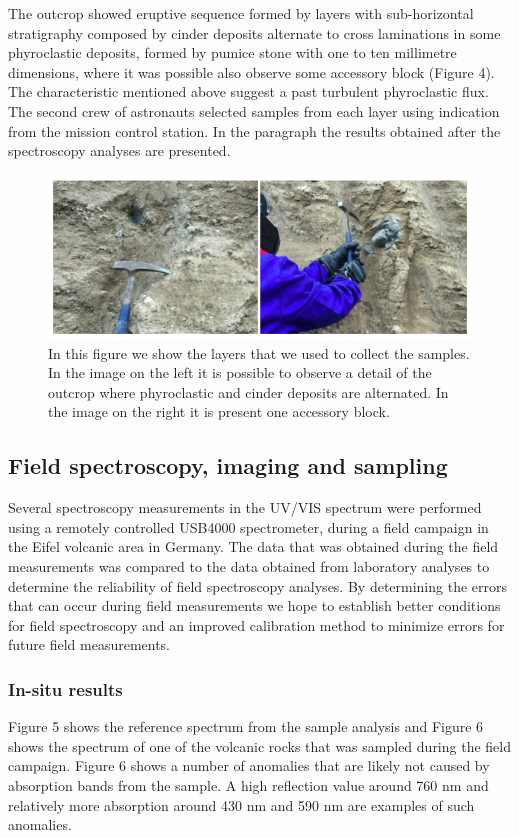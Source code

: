 \documentclass[preprint]{elsarticle}
\begin{document}
The outcrop showed eruptive sequence formed by layers with sub-horizontal stratigraphy composed by cinder deposits alternate to cross laminations in some phyroclastic deposits, formed by pumice stone with one to ten millimetre dimensions, where it was possible also observe some accessory block (Figure 4). The characteristic mentioned above suggest a past turbulent phyroclastic flux. The second crew of astronauts selected samples from each layer using indication from the mission control station. In the paragraph the results obtained after the spectroscopy analyses are presented.

\begin{figure}
\centering
\includegraphics{img/figure04.png}
\caption{In this figure we show the layers that we used to collect the samples. In the image on the left it is possible to observe a detail of the outcrop where phyroclastic and cinder deposits are alternated. In the image on the right it is present one accessory block.}
\end{figure}

\subsection{Field spectroscopy, imaging and sampling}
Several spectroscopy measurements in the UV/VIS spectrum were performed using a remotely controlled USB4000 spectrometer, during a field campaign in the Eifel volcanic area in Germany. The data that was obtained during the field measurements was compared to the data obtained from laboratory analyses to determine the reliability of field spectroscopy analyses. By determining the errors that can occur during field measurements we hope to establish better conditions for field spectroscopy and an improved calibration method to minimize errors for future field measurements.

\subsubsection{In-situ results}
Figure 5 shows the reference spectrum from the sample analysis and Figure 6 shows the spectrum of one of the volcanic rocks that was sampled during the field campaign. Figure 6 shows a number of anomalies that are likely not caused by absorption bands from the sample. A high reflection value around 760 nm and relatively more absorption around 430 nm and 590 nm are examples of such anomalies.
\end{document}
